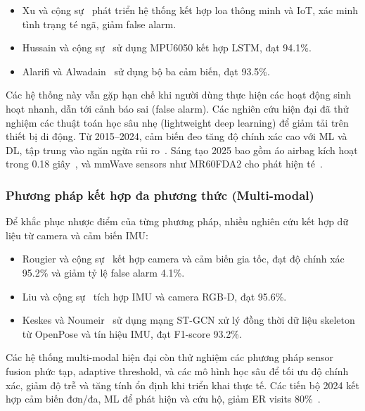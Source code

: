\begin{itemize}
    \item Xu và cộng sự~\cite{xu2023} phát triển hệ thống kết hợp loa thông minh và IoT, xác minh tình trạng té ngã, giảm false alarm.  
    \item Hussain và cộng sự~\cite{hussain2019} sử dụng MPU6050 kết hợp LSTM, đạt 94.1\%.  
    \item Alarifi và Alwadain~\cite{alarifi2021} sử dụng bộ ba cảm biến, đạt 93.5\%.  
\end{itemize}

Các hệ thống này vẫn gặp hạn chế khi người dùng thực hiện các hoạt động sinh hoạt nhanh, dẫn tới cảnh báo sai (false alarm). Các nghiên cứu hiện đại đã thử nghiệm các thuật toán học sâu nhẹ (lightweight deep learning) để giảm tải trên thiết bị di động. Từ 2015--2024, cảm biến đeo tăng độ chính xác cao với ML và DL, tập trung vào ngăn ngừa rủi ro~\cite{wearable20152024}. Sáng tạo 2025 bao gồm áo airbag kích hoạt trong 0.18 giây~\cite{airbag2025}, và mmWave sensors như MR60FDA2 cho phát hiện té~\cite{mmwave2025}.

\subsubsection{Phương pháp kết hợp đa phương thức (Multi-modal)}
Để khắc phục nhược điểm của từng phương pháp, nhiều nghiên cứu kết hợp dữ liệu từ camera và cảm biến IMU:

\begin{itemize}
    \item Rougier và cộng sự~\cite{rougier2011} kết hợp camera và cảm biến gia tốc, đạt độ chính xác 95.2\% và giảm tỷ lệ false alarm 4.1\%.  
    \item Liu và cộng sự~\cite{liu2018} tích hợp IMU và camera RGB-D, đạt 95.6\%.  
    \item Keskes và Noumeir~\cite{keskes2021} sử dụng mạng ST-GCN xử lý đồng thời dữ liệu skeleton từ OpenPose và tín hiệu IMU, đạt F1-score 93.2\%.  
\end{itemize}

Các hệ thống multi-modal hiện đại còn thử nghiệm các phương pháp sensor fusion phức tạp, adaptive threshold, và các mô hình học sâu để tối ưu độ chính xác, giảm độ trễ và tăng tính ổn định khi triển khai thực tế. Các tiến bộ 2024 kết hợp cảm biến đơn/đa, ML để phát hiện và cứu hộ, giảm ER visits 80\%~\cite{multimodal2024}.

